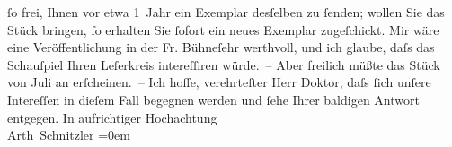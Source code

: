 \begin{ledgroupsized}[t]{13cm}
                    ſo frei, Ihnen vor etwa {\pb}1 Jahr ein Exemplar desſelben
                    zu ſenden; wollen Sie das Stück bringen, ſo erhalten Sie ſofort ein neues Exemplar
                    zugeſchickt.\pend
           \pstart
           Mir wäre eine Veröffentlichung in der Fr. Bühneſehr werthvoll, und ich glaube, daſs das
                    Schauſpiel Ihren Leſerkreis intereſſiren {\pb}würde. –
                    Aber freilich müßte das Stück von Juli an erſcheinen. –\pend
           \pstart
           Ich hoffe, verehrteſter Herr Doktor, daſs ſich unſere Intereſſen in dieſem Fall
                    begegnen werden und ſehe Ihrer baldigen Antwort entgegen.\pend
           \pstart
           In aufrichtiger Hochachtung{\\[\baselineskip]}\spacefill\mbox{Arth Schnitzler}\pend
           \leftskip=0em{}
         
         \endnumbering{}\end{ledgroupsized}  \newcommand{\dateiname}{L00222}\newcommand{\titel}{Arthur Schnitzler an Wilhelm Bölsche, 14. 6. 1893}\newcommand{\editorInnen}{Martin Anton Müller und Gerd-Hermann Susen}
      